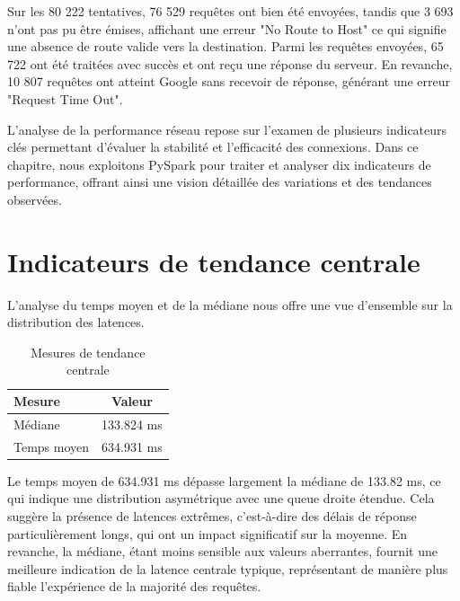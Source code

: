 Sur les 80 222 tentatives, 76 529 requêtes ont bien été envoyées, tandis que 3 693 n’ont pas pu être émises, affichant une erreur "No Route to Host" ce qui signifie une absence de route valide vers la destination. Parmi les requêtes envoyées, 65 722 ont été traitées avec succès et ont reçu une réponse du serveur. En revanche, 10 807 requêtes ont atteint Google sans recevoir de réponse, générant une erreur "Request Time Out".

\newpage
\chaptitle
\fancyhead[l]{}
\vspace{-0.5cm}\vspace{0.4cm}
\hspace{0.5cm}

L’analyse de la performance réseau repose sur l’examen de plusieurs indicateurs clés permettant d’évaluer la stabilité et l’efficacité des connexions. Dans ce chapitre, nous exploitons PySpark pour traiter et analyser dix indicateurs de performance, offrant ainsi une vision détaillée des variations et des tendances observées.
\section{Indicateurs de tendance centrale }
L'analyse du temps moyen et de la médiane nous offre une vue d'ensemble sur la distribution des latences.
\begin{table}[H]	
	\captionsetup{justification=raggedright, singlelinecheck=false}
	\centering
	\caption{Mesures de tendance centrale}\vspace{-0.2cm}
	\fontsize{10}{20}\selectfont
	\begin{tabular}{||>{\raggedleft\arraybackslash}m{4cm}||c||}
		\hline
		\rowcolor{cyan}\textbf{Mesure} & \textbf{Valeur} \\
		\hline
		Médiane & 133.824 ms \\
		\hline
		Temps moyen & 634.931 ms \\
		\hline
	\end{tabular}
\end{table}
 Le temps moyen de 634.931 ms dépasse largement la médiane de 133.82 ms, ce qui indique une distribution asymétrique avec une queue droite étendue. Cela suggère la présence de latences extrêmes, c'est-à-dire des délais de réponse particulièrement longs, qui ont un impact significatif sur la moyenne. En revanche, la médiane, étant moins sensible aux valeurs aberrantes, fournit une meilleure indication de la latence centrale typique, représentant de manière plus fiable l'expérience de la majorité des requêtes.

